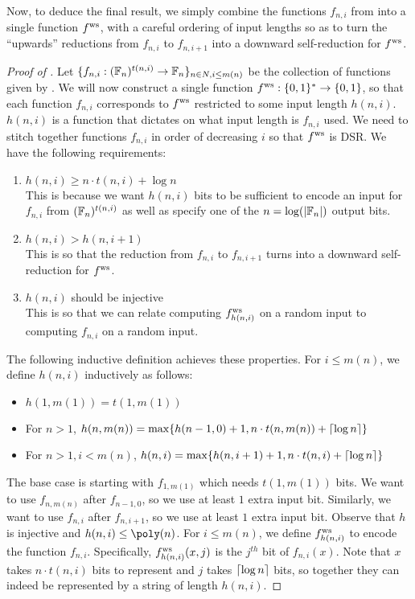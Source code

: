 Now, to deduce the final result, we simply combine the functions $f_{n,i}$ from  into a single function $ f^{\text{ws}} $, with a careful ordering of input lengths so as to turn the ``upwards'' reductions from $f_{n,i}$ to $f_{n,i+1}$ into a downward self-reduction for $ f^{\text{ws}} $.


\begin{proof}[Proof of  ]
	Let $\{f_{n,i} : (\mathbb{F}_n)^{t(n,i)} \rightarrow \mathbb{F}_n\}_{n \in N,i \leq m(n)}$ be the collection of functions given by . We will now construct a single function $ f^{\text{ws}}  : \{0, 1\}^* \rightarrow \{0, 1\}$, so that each function $f_{n,i}$ corresponds to $ f^{\text{ws}} $ restricted to some input length $h(n, i)$. $h(n,i)$ is a function that dictates on what input length is $f_{n,i}$ used.
	We need to stitch together functions $f_{n,i}$ in order of decreasing $i$ so that $ f^{\text{ws}} $ is DSR. We have the following requirements:
	\begin{enumerate}
		\item $h(n, i) \geq n \cdot t(n, i) + \log n$ \\
		This is because we want $h(n, i)$ bits to be sufficient to encode an input for $f_{n,i}$ from $(\mathbb{F}_n)^{t(n,i)}$ as well as specify one of the $n = \log (\lvert\mathbb{F}_n\rvert)$ output bits.
		\item $h(n, i) > h(n, i + 1)$ \\
		This is so that the reduction from $f_{n,i}$ to $f_{n,i+1}$ turns into a downward self-reduction for $ f^{\text{ws}} $.
		\item $h(n,i)$ should be injective \\
		This is so that we can relate computing $ f^{\text{ws}} _{h(n,i)}$ on a random input to computing $f_{n,i}$ on a random input. 
	\end{enumerate}
	The following inductive definition achieves these properties. For $i \leq m(n)$, we define $h(n, i)$ inductively as follows:
	\begin{itemize}
		\item $h(1, m(1)) = t(1, m(1))$
		\item For $n > 1$, $h(n, m(n)) = \max \{h(n - 1, 0) + 1, n \cdot t(n, m(n)) + \lceil\log n\rceil\}$
		\item For $n > 1, i < m(n)$, $h(n, i) = \max \{h(n, i + 1) + 1, n \cdot t(n, i) + \lceil\log n\rceil \}$
	\end{itemize}
	The base case is starting with $f_{1,m(1)}$ which needs $t(1, m(1))$ bits. We want to use $f_{n,m(n)}$ after $f_{n-1,0}$, so we use at least $1$ extra input bit. Similarly, we want to use $f_{n,i}$ after $f_{n,i+1}$, so we use at least $1$ extra input bit. 
	Observe that $h$ is injective and $h(n, i) \leq \poly(n)$. For $i \leq m(n)$, we define	$ f^{\text{ws}} _{h(n,i)}$ to encode the function $f_{n,i}$.  Specifically, $ f^{\text{ws}} _{h(n,i)}(x, j)$ is the $j^{th}$ bit of $f_{n,i}(x)$. Note that $x$ takes $n \cdot t(n, i)$ bits to represent and $j$ takes $\lceil\log n\rceil$ bits, so together they can indeed be represented by a string of length $h(n, i)$.


\end{proof}
